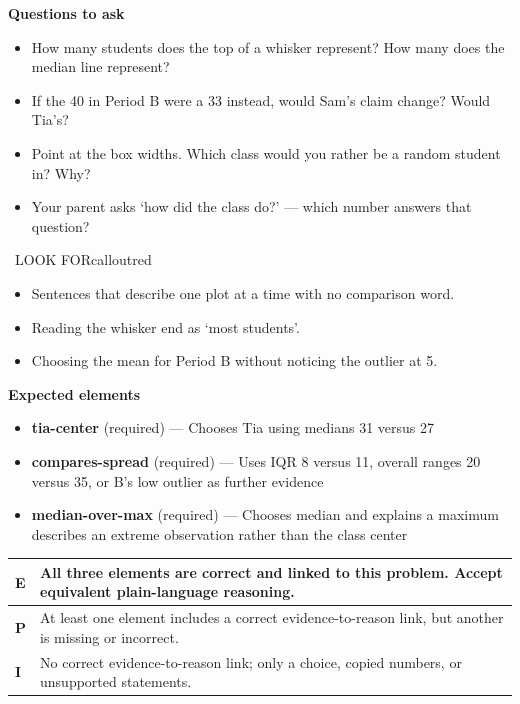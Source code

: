 \documentclass[11pt]{article}
\begin{document}
\textbf{Questions to ask}
\begin{itemize}[leftmargin=1.5em,itemsep=2pt,topsep=2pt]
  \item How many students does the top of a whisker represent? How many does the median line represent?
  \item If the 40 in Period B were a 33 instead, would Sam's claim change? Would Tia's?
  \item Point at the box widths. Which class would you rather be a random student in? Why?
  \item Your parent asks `how did the class do?' --- which number answers that question?
\end{itemize}

\begin{callout}{\IconWarn\ LOOK FOR}{calloutred}
\begin{itemize}[leftmargin=1.5em,itemsep=2pt,topsep=2pt]
  \item Sentences that describe one plot at a time with no comparison word.
  \item Reading the whisker end as `most students'.
  \item Choosing the mean for Period B without noticing the outlier at 5.
\end{itemize}
\end{callout}


\textbf{Expected elements}
\begin{itemize}[leftmargin=1.5em,itemsep=2pt,topsep=2pt]
  \item \textbf{tia-center} (required) --- Chooses Tia using medians 31 versus 27
  \item \textbf{compares-spread} (required) --- Uses IQR 8 versus 11, overall ranges 20 versus 35, or B's low outlier as further evidence
  \item \textbf{median-over-max} (required) --- Chooses median and explains a maximum describes an extreme observation rather than the class center
\end{itemize}

{\small\renewcommand{\arraystretch}{1.25}
\noindent\begin{tabular}{|p{0.5in}|p{5.9in}|}
\hline
\textbf{E} & All three elements are correct and linked to this problem. Accept equivalent plain-language reasoning. \\ \hline
\textbf{P} & At least one element includes a correct evidence-to-reason link, but another is missing or incorrect. \\ \hline
\textbf{I} & No correct evidence-to-reason link; only a choice, copied numbers, or unsupported statements. \\ \hline
\end{tabular}}
\end{document}
